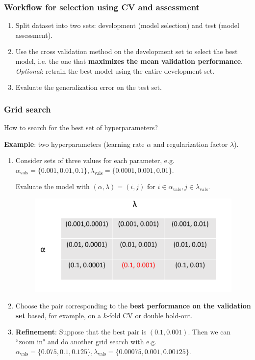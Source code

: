 \documentclass{beamer}
\begin{document}
	\begin{frame}
		\frametitle{Workflow for selection using CV and assessment}
		\begin{enumerate}
			\item Split dataset into two sets: development (model selection) and test (model assessment).
			\item Use the cross validation method on the development set to select the best model, i.e. the one that \textbf{maximizes the mean validation performance}.
			\textit{Optional}:  retrain the best model using the entire development set. 
			\item Evaluate the generalization error on the test set.
		\end{enumerate}
	
	\end{frame}

	\begin{frame}
		\frametitle{Grid search}
		
		How to search for the best set of hyperparameters?
		
		\vspace{1mm}
		
		\textbf{Example}: two hyperparameters (learning rate $\alpha$ and regularization factor $\lambda$). 
		\begin{enumerate}
			\item Consider sets of three values for each parameter, e.g. $\alpha_{\text{vals}} = \{0.001, 0.01, 0.1\}, \lambda_{\text{vals}} = \{0.0001, 0.001, 0.01\}$. 
			
			Evaluate the model with $(\alpha, \lambda) = (i,j)$ for $i \in \alpha_{\text{vals}}, j \in \lambda_{\text{vals}}$.
			
			\begin{figure}
				\centering
				\includegraphics[scale=0.35]{images/grid-search}
			\end{figure}
			
			\item Choose the pair corresponding to the \textbf{best performance on the validation set} based, for example, on a $k$-fold CV or double hold-out. 
			
			\item \textbf{Refinement}: Suppose that the best pair is $(0.1, 0.001)$. Then we can ``zoom in" and do another grid search with e.g. $\alpha_{\text{vals}} = \{0.075, 0.1, 0.125\}, \lambda_{\text{vals}} = \{0.00075, 0.001, 0.00125\}$. 
		\end{enumerate}
		
		
	\end{frame}
	
\end{document}
